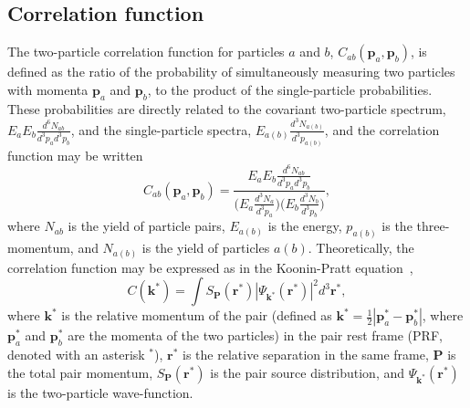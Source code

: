 \documentclass[ALICE,manyauthors]{cernphprep}
\begin{document}
\subsection{Correlation function}
\label{sec:CorrelationFunction}
The two-particle correlation function for particles $a$ and $b$, $C_{ab}(\mathbf{p}_{a},\mathbf{p}_{b})$, is defined as the ratio of the probability of simultaneously measuring two particles with momenta $\mathbf{p}_{a}$ and $\mathbf{p}_{b}$, to the product of the single-particle probabilities.
These probabilities are directly related to the covariant two-particle spectrum, $E_{a}E_{b}\frac{d^{6}N_{ab}}{d^{3}p_{a}d^{3}p_{b}}$, and the single-particle spectra, $E_{a(b)}\frac{d^{3}N_{a(b)}}{d^{3}p_{a(b)}}$, and the correlation function may be written
\begin{equation}
  C_{ab}(\mathbf{p}_{a},\mathbf{p}_{b}) = \frac{E_{a}E_{b}\frac{d^{6}N_{ab}}{d^{3}p_{a}d^{3}p_{b}}}{\big( E_{a}\frac{d^{3}N_{a}}{d^{3}p_{a}} \big) \big( E_{b}\frac{d^{3}N_{b}}{d^{3}p_{b}} \big)},
\label{eqn:CfRatioSpectra}
\end{equation}
where $N_{ab}$ is the yield of particle pairs, $E_{a(b)}$ is the energy, $p_{a(b)}$ is the three-momentum, and $N_{a(b)}$ is the yield of particles $a(b)$.
Theoretically, the correlation function may be expressed as in the Koonin-Pratt equation~\cite{Koonin:1977fh, Pratt:1990zq},
\begin{equation}
 C(\mathbf{k^{*}}) = \int S_{\mathbf{P}}(\mathbf{r^{*}})|\Psi_{\mathbf{k^{*}}}(\mathbf{r^{*}})|^{2}d^{3}\mathbf{r^{*}},
\label{eqn:KooninPrattEqn}
\end{equation}
where $\mathbf{k}^{*}$ is the relative momentum of the pair (defined as $\mathbf{k}^{*} = \frac{1}{2}|\mathbf{p}_{a}^{*}-\mathbf{p}_{b}^{*}|$, where $\mathbf{p}_{a}^{*}$ and $\mathbf{p}_{b}^{*}$ are the momenta of the two particles) in the pair rest frame (PRF, denoted with an asterisk $^{*}$), $\mathbf{r}^{*}$ is the relative separation in the same frame, $\mathbf{P}$ is the total pair momentum, $S_{\mathbf{P}}(\mathbf{r^{*}})$ is the pair source distribution, and $\Psi_{\mathbf{k^{*}}}(\mathbf{r^{*}})$ is the two-particle wave-function.
\end{document}
